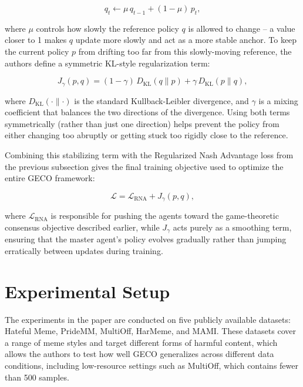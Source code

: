 \documentclass[manuscript,review]{acmart}
\begin{document}
\begin{equation}
q_t \leftarrow \mu\, q_{t-1} + (1 - \mu)\, p_t,
\end{equation}

where $\mu$ controls how slowly the reference policy $q$ is allowed to change -- a value
closer to 1 makes $q$ update more slowly and act as a more stable anchor. To keep the
current policy $p$ from drifting too far from this slowly-moving reference, the authors
define a symmetric KL-style regularization term:

\begin{equation}
J_\gamma(p, q) = (1 - \gamma)\, D_{\text{KL}}(q \parallel p) + \gamma\, D_{\text{KL}}(p \parallel q),
\end{equation}

where $D_{\text{KL}}(\cdot \parallel \cdot)$ is the standard Kullback-Leibler divergence,
and $\gamma$ is a mixing coefficient that balances the two directions of the divergence.
Using both terms symmetrically (rather than just one direction) helps prevent the policy
from either changing too abruptly or getting stuck too rigidly close to the reference.

Combining this stabilizing term with the Regularized Nash Advantage loss from the
previous subsection gives the final training objective used to optimize the entire GECO
framework:

\begin{equation}
\mathcal{L} = \mathcal{L}_{\text{RNA}} + J_\gamma(p, q),
\end{equation}

where $\mathcal{L}_{\text{RNA}}$ is responsible for pushing the agents toward the
game-theoretic consensus objective described earlier, while $J_\gamma$ acts purely as a
smoothing term, ensuring that the master agent's policy evolves gradually rather than
jumping erratically between updates during training.

\section{Experimental Setup}

The experiments in the paper are conducted on five publicly available datasets: Hateful
Meme, PrideMM, MultiOff, HarMeme, and MAMI. These datasets cover a range of meme styles
and target different forms of harmful content, which allows the authors to test how well
GECO generalizes across different data conditions, including low-resource settings such
as MultiOff, which contains fewer than 500 samples.
\end{document}
